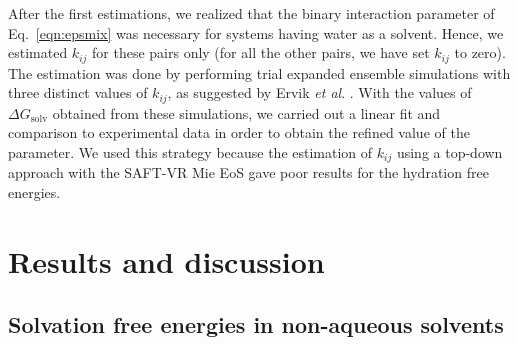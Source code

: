 \documentclass[preprint]{elsarticle}
\begin{document}
	After the first estimations, we realized that the binary interaction parameter of Eq.~\eqref{eqn:epsmix} was necessary for systems having water as a solvent. Hence, we estimated $k_{ij}$ for these pairs only (for all the other pairs, we have set $k_{ij}$ to zero). The estimation was done by performing trial expanded ensemble simulations with three distinct values of $k_{ij}$, as suggested by Ervik \textit{et al}. \cite{ervik20162}. With the values of $\Delta G_\text{solv}$ obtained from these simulations, we carried out a linear fit and comparison to experimental data \cite{P29900000291, doi:10.1021/ct050097l} in order to obtain the refined value of the parameter. We used this strategy because the estimation of $k_{ij}$ using a top-down approach with the SAFT-VR Mie EoS gave poor results for the hydration free energies.
	
	\section{Results and discussion}
	\label{sec:results}
	
	\subsection{Solvation free energies in non-aqueous solvents}
	\label{sec:non-aqueous}
	
\end{document}
